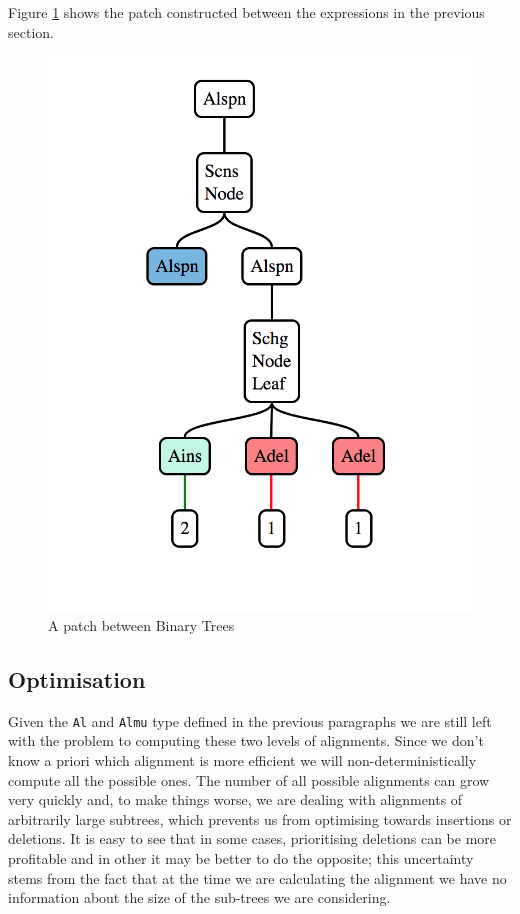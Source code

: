\documentclass[11pt, titlepage]{article}
\begin{document}
Figure \ref{fig:tree} shows the patch constructed between the expressions in the 
previous section.
\begin{figure}[h]
\centering
\includegraphics[scale=0.5]{tree.png}
\caption{A patch between Binary Trees}
\label{fig:tree}  
\end{figure}


\subsection{Optimisation}\label{optimisations}

Given the \texttt{Al} and \texttt{Almu} type defined in the previous paragraphs we are still left with the problem
to computing these two levels of alignments. Since we don't know a priori which alignment
is more efficient we will non-deterministically compute all the possible ones. The number of all possible alignments  
can grow very quickly and, to make things worse, we are dealing with alignments of arbitrarily large subtrees, which prevents
us from optimising towards insertions or deletions. It is easy to see
that in some cases, prioritising deletions can be more profitable and in
other it may be better to do the opposite; this uncertainty stems from
the fact that at the time we are calculating the alignment we have no
information about the size of the sub-trees we are considering.
\end{document}
